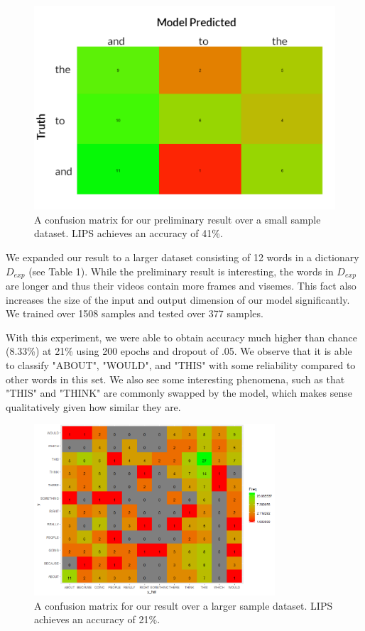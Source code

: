 \documentclass{article}
\begin{document}
   \begin{figure}[h!]
 \centering
  \includegraphics{result1}
 \caption{A confusion matrix for our preliminary result over a small sample dataset. LIPS achieves an accuracy of 41\%.}
 \end{figure}

We expanded our result to a larger dataset consisting of 12 words in a dictionary $D_{exp}$ (see Table 1). While the preliminary result is interesting, the words in $D_{exp}$ are longer and thus their videos contain more frames and visemes. This fact also increases the size of the input and output dimension of our model significantly. We trained over 1508 samples and tested over 377 samples.

With this experiment, we were able to obtain accuracy much higher than chance (8.33\%) at 21\% using 200 epochs and dropout of .05. We observe that it is able to classify "ABOUT", "WOULD", and "THIS" with some reliability compared to other words in this set. We also see some interesting phenomena, such as that "THIS" and "THINK" are commonly swapped by the model, which makes sense qualitatively given how similar they are.

   \begin{figure}[h!]
 \centering
  \includegraphics[width=0.8\textwidth]{result2}
 \caption{A confusion matrix for our result over a larger sample dataset. LIPS achieves an accuracy of 21\%.}
 \end{figure}
\end{document}
